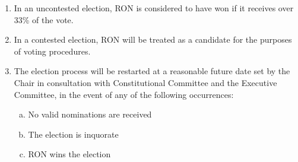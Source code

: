 \documentclass[12pt]{article}
\begin{document}
\begin{enumerate}
    \item In an uncontested election, RON is considered to have won if it receives over 33\% of the vote.
    \item In a contested election, RON will be treated as a candidate for the purposes of voting procedures.
    \item The election process will be restarted at a reasonable future date set by the Chair in consultation with Constitutional Committee and the Executive Committee, in the event of any of the following occurrences:
    \begin{enumerate}[(a)]
        \item No valid nominations are received
        \item The election is inquorate
        \item RON wins the election
    \end{enumerate}

\end{enumerate}
\end{document}
